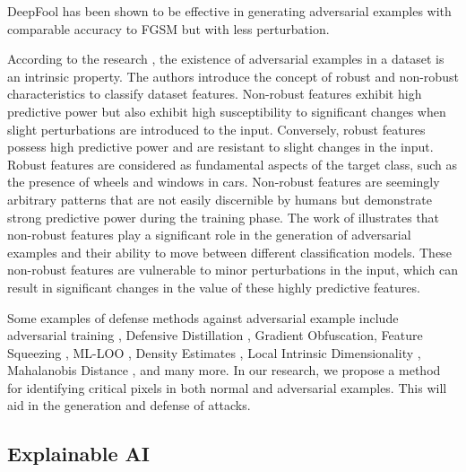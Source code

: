 \documentclass[10pt, conference, a4paper, final]{IEEEtran}
\begin{document}
DeepFool has been shown to be effective in generating adversarial examples with comparable accuracy to FGSM but with less perturbation.

According to the research \cite {Ilyas.}, the existence of adversarial examples in a dataset is an intrinsic property. The authors introduce the concept of robust and non-robust characteristics to classify dataset features. Non-robust features exhibit high predictive power but also exhibit high susceptibility to significant changes when slight perturbations are introduced to the input. Conversely, robust features possess high predictive power and are resistant to slight changes in the input. Robust features are considered as fundamental aspects of the target class, such as the presence of wheels and windows in cars. Non-robust features are seemingly arbitrary patterns that are not easily discernible by humans but demonstrate strong predictive power during the training phase. The work of \cite {Ilyas.} illustrates that non-robust features play a significant role in the generation of adversarial examples and their ability to move between different classification models. These non-robust features are vulnerable to minor perturbations in the input, which can result in significant changes in the value of these highly predictive features.

Some examples of defense methods against adversarial example include adversarial training \cite {Goodfellow.}, Defensive Distillation \cite {Papernot}, Gradient Obfuscation, Feature Squeezing \cite {Evans}, ML-LOO \cite {Yang}, Density Estimates \cite {Feinman}, Local Intrinsic Dimensionality \cite {Ma}, Mahalanobis Distance 
 \cite {Lee}, and many more. In our research, we propose a method for identifying critical pixels in both normal and adversarial examples. This will aid in the generation and defense of attacks. 


\subsection{Explainable AI}
\end{document}
